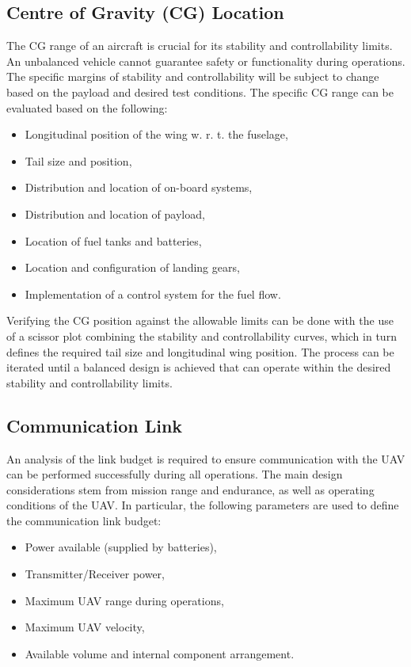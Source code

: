 \subsection{Centre of Gravity (CG) Location}
The CG range of an aircraft is crucial for its stability and controllability limits. An unbalanced vehicle cannot guarantee safety or functionality during operations. The specific margins of stability and controllability will be subject to change based on the payload and desired test conditions. The specific CG range can be evaluated based on the following:
\begin{itemize}
    \item Longitudinal position of the wing w. r. t. the fuselage,
    \item Tail size and position,
    \item Distribution and location of on-board systems,
    \item Distribution and location of payload,
    \item Location of fuel tanks and batteries,
    \item Location and configuration of landing gears,
    \item Implementation of a control system for the fuel flow.
\end{itemize}

Verifying the CG position against the allowable limits can be done with the use of a scissor plot combining the stability and controllability curves, which in turn defines the required tail size and longitudinal wing position. The process can be iterated until a balanced design is achieved that can operate within the desired stability and controllability limits.

\subsection{Communication Link}
An analysis of the link budget is required to ensure communication with the UAV can be performed successfully during all operations. The main design considerations stem from mission range and endurance, as well as operating conditions of the UAV. In particular, the following parameters are used to define the communication link budget:
\begin{itemize}
    \item Power available (supplied by batteries),
    \item Transmitter/Receiver power,
    \item Maximum UAV range during operations,
    \item Maximum UAV velocity,
    \item Available volume and internal component arrangement.
\end{itemize}

